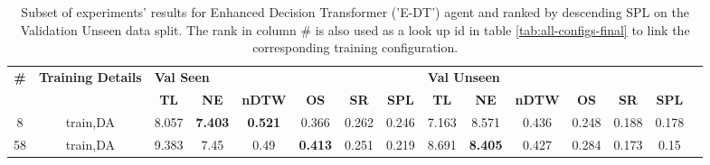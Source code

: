 \begin{table}
\centering
\caption{\label{tab:e_dt_dagger}Subset of experiments' results for Enhanced Decision Transformer ('E-DT') agent and ranked by descending SPL on the Validation Unseen data split. The rank in column \# is also used as a look up id in table \ref{tab:all-configs-final} to link the corresponding training configuration.}
\begin{tabular}{@{\hskip3pt}c@{\hskip3pt}c@{\hskip3pt}c@{\hskip3pt}c@{\hskip3pt}c@{\hskip3pt}c@{\hskip3pt}c@{\hskip3pt}c@{\hskip3pt}c@{\hskip3pt}c@{\hskip3pt}c@{\hskip3pt}c@{\hskip3pt}c@{\hskip3pt}c@{\hskip3pt}c}
\toprule
\textbf{\#} & \textbf{Training Details} & \multicolumn{6}{l}{\textbf{Val Seen}} & \multicolumn{6}{l}{\textbf{Val Unseen}} \\
 \textbf{~} &                \textbf{~} &       \textbf{TL} &     \textbf{NE} &   \textbf{nDTW} &     \textbf{OS} & \textbf{SR} & \textbf{SPL} &         \textbf{TL} &     \textbf{NE} & \textbf{nDTW} & \textbf{OS} & \textbf{SR} & \textbf{SPL} \\
\midrule
          8 &                  train,DA &             8.057 &  \textbf{7.403} &  \textbf{0.521} &           0.366 &       0.262 &        0.246 &               7.163 &           8.571 &         0.436 &       0.248 &       0.188 &        0.178 \\
         58 &                  train,DA &             9.383 &            7.45 &            0.49 &  \textbf{0.413} &       0.251 &        0.219 &               8.691 &  \textbf{8.405} &         0.427 &       0.284 &       0.173 &         0.15 \\
\bottomrule
\end{tabular}
\end{table}
